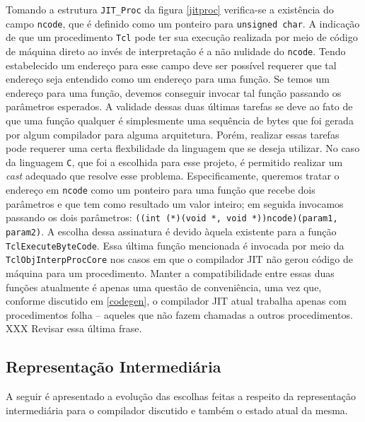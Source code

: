 Tomando a estrutura \verb!JIT_Proc! da figura \ref{jitproc}
verifica-se a existência do campo \verb!ncode!, que é definido como
um ponteiro para \verb!unsigned char!. A indicação de que um
procedimento \texttt{Tcl} pode ter sua execução realizada por meio de
código de máquina direto ao invés de interpretação é a não nulidade do
\verb!ncode!. Tendo estabelecido um endereço para esse campo deve ser
possível requerer que tal endereço seja entendido como um endereço para
uma função. Se temos um endereço para uma função, devemos conseguir
invocar tal função passando os parâmetros esperados. A validade dessas
duas últimas tarefas se deve ao fato de que uma função qualquer é
simplesmente uma sequência de bytes que foi gerada por algum
compilador para alguma arquitetura. Porém, realizar essas tarefas pode
requerer uma certa flexbilidade da linguagem que se deseja
utilizar. No caso da linguagem \texttt{C}, que foi a escolhida para
esse projeto, é permitido realizar um \textit{cast} adequado que
resolve esse problema. Especificamente, queremos tratar o endereço em
\verb!ncode! como um ponteiro para uma função que recebe dois
parâmetros e que tem como resultado um valor inteiro;
em seguida invocamos passando os dois parâmetros:
\verb!((int (*)(void *, void *))ncode)(param1, param2)!. A escolha
dessa assinatura é devido àquela existente para a função
\verb!TclExecuteByteCode!. Essa última função mencionada é invocada
por meio da \verb!TclObjInterpProcCore! nos casos em que o compilador
JIT não gerou código de máquina para um procedimento. Manter a
compatibilidade entre essas duas funções atualmente é
apenas uma questão de conveniência, uma vez que, conforme discutido em
\ref{codegen}, o compilador JIT atual trabalha apenas com
procedimentos folha -- aqueles que não fazem chamadas a outros procedimentos.
XXX Revisar essa última frase.

\subsection{Representação Intermediária}
A seguir é apresentado a evolução das escolhas feitas a respeito da
representação intermediária para o compilador discutido e também o
estado atual da mesma.

